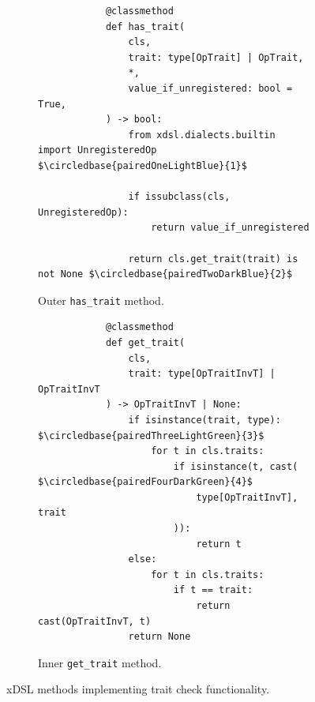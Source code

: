 
\begin{figure}[H]
    \begin{subfigure}[b]{0.45\textwidth}
       \centering
        \begin{verbatim}
            @classmethod
            def has_trait(
                cls,
                trait: type[OpTrait] | OpTrait,
                *,
                value_if_unregistered: bool = True,
            ) -> bool:
                from xdsl.dialects.builtin import UnregisteredOp $\circledbase{pairedOneLightBlue}{1}$

                if issubclass(cls, UnregisteredOp):
                    return value_if_unregistered

                return cls.get_trait(trait) is not None $\circledbase{pairedTwoDarkBlue}{2}$
        \end{verbatim}
        \footnotesize\vspace{1.5em}
        \caption{Outer \texttt{has_trait} method.}
        \label{listing:ubenchmark-trait-checks-xdsl-has}
    \end{subfigure}
    \hfill
    \begin{subfigure}[b]{0.45\textwidth}
        \centering
        \begin{verbatim}
            @classmethod
            def get_trait(
                cls,
                trait: type[OpTraitInvT] | OpTraitInvT
            ) -> OpTraitInvT | None:
                if isinstance(trait, type): $\circledbase{pairedThreeLightGreen}{3}$
                    for t in cls.traits:
                        if isinstance(t, cast( $\circledbase{pairedFourDarkGreen}{4}$
                            type[OpTraitInvT], trait
                        )):
                            return t
                else:
                    for t in cls.traits:
                        if t == trait:
                            return cast(OpTraitInvT, t)
                return None
        \end{verbatim}
        \caption{Inner \texttt{get_trait} method.}
        \label{listing:ubenchmark-trait-checks-xdsl-get}
    \end{subfigure}
    \vspace{1em}
    \captionsetup{name=Listing}
    \caption{xDSL methods implementing trait check functionality.}
    \label{listing:ubenchmark-trait-checks-xdsl}
\end{figure}


